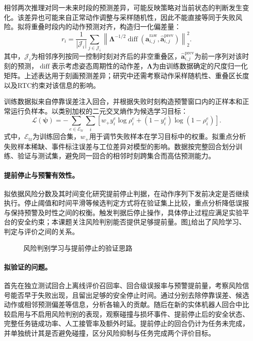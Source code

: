 相邻两次推理对同一未来时段的预测差异，可能反映策略对当前状态的判断发生变化。该差异也可能来自正常动作调整与采样随机性，因此不能直接等同于失败风险。拟将重叠时段内的动作预测对齐，构造归一化偏差量：
\begin{equation}
  r_i = \frac{1}{|\mathcal J_i|}\sum_{j\in\mathcal J_i}
  \left\|\boldsymbol\Lambda^{-1/2}
  \operatorname{diff}\!\left(\widehat{\mathbf a}^{\mathrm{raw}}_{i,j},
  \widehat{\mathbf a}^{\mathrm{prev}}_{i,j}\right)\right\|_2^2.
  \label{eq:cross-chunk-inconsistency}
\end{equation}
其中，\(\mathcal J_i\)为相邻序列按同一控制时刻对齐后的非空重叠区，\(\widehat{\mathbf a}^{\mathrm{prev}}_{i,j}\)为前一序列对该时刻的预测，\(\operatorname{diff}\)表示考虑姿态周期性的动作差，\(\boldsymbol\Lambda\)为由训练数据确定的尺度归一化矩阵。上述表达用于刻画预测差异；研究中还需考察动作采样随机性、重叠区长度以及RTC约束对该信息的影响。

训练数据拟来自停靠误差注入回合，并根据失败时刻构造预警窗口内的正样本和正常运行负样本。以类别加权的二元交叉熵作为候选学习目标：
\begin{equation}
  \mathcal L(\boldsymbol\psi)
  =-\sum_{e\in\mathcal E_{\mathrm{tr}}}\sum_i
  \left[w_+y_i^e\log\rho_i^e+(1-y_i^e)\log(1-\rho_i^e)\right].
  \label{eq:risk-loss}
\end{equation}
式中，\(\mathcal E_{\mathrm{tr}}\)为训练回合集，\(w_+\)用于调节失败样本在学习目标中的权重。拟重点分析失败样本稀缺、事件标注误差与工位差异对模型的影响。数据按完整回合划分训练、验证与测试集，避免同一回合的相邻时刻跨集合而高估预测能力。

\paragraph{提前停止与预警有效性。}
拟依据风险分数及其时间变化研究提前停止判据，在动作序列下发前决定是否继续执行。停止阈值和时间平滑等候选判定方式将在验证集上比较，重点分析降低误报与保持预警及时性之间的权衡。触发判据后停止操作，具体停止过程应满足实验平台的安全约束；本课题关注风险判别能否提供足够提前量。图\ref{fig:risk-prediction-stop}给出了风险学习、判定与评价之间的关系。

\begin{figure}[htbp]
  \centering
  
  \caption{风险判别学习与提前停止的验证思路}
  \label{fig:risk-prediction-stop}
\end{figure}

\paragraph{拟验证的问题。}
首先在独立测试回合上离线评价召回率、回合级误报率与预警提前量，考察风险信号能否早于失败出现，且留出足够的安全停止时间。通过分别去除停靠误差、候选动作或相邻预测偏差等信息，分析各输入的贡献。随后在新的实体机器人回合中比较启用与不启用风险判别的表现，观察碰撞与损坏事件、提前停止后的安全状态、完整任务链成功率、人工接管率及额外时延。提前停止的回合仍计为任务未完成，并单独统计其是否避免碰撞，区分风险抑制与任务完成两个评价目标。

